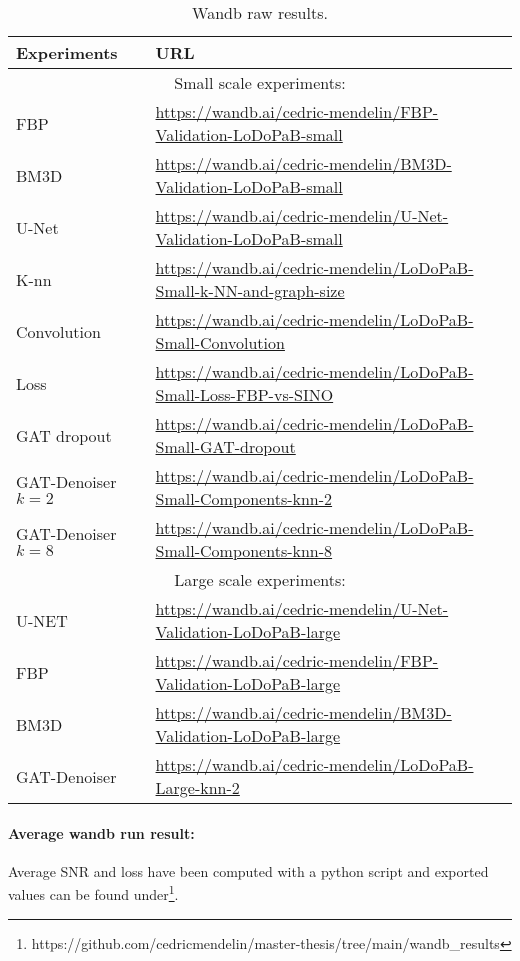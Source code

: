 \begin{table}[H]
  \centering
  \begin{tabular}{l|l}
    \toprule
    \textbf{Experiments} & \textbf{URL} \\ 
    \midrule
    \multicolumn{2}{c}{Small scale experiments:} \\
    FBP & \url{https://wandb.ai/cedric-mendelin/FBP-Validation-LoDoPaB-small} \\ \hline
    BM3D & \url{https://wandb.ai/cedric-mendelin/BM3D-Validation-LoDoPaB-small} \\ \hline
    U-Net& \url{https://wandb.ai/cedric-mendelin/U-Net-Validation-LoDoPaB-small} \\ \hline
    K-nn &\url{https://wandb.ai/cedric-mendelin/LoDoPaB-Small-k-NN-and-graph-size} \\ \hline
    Convolution & \url{https://wandb.ai/cedric-mendelin/LoDoPaB-Small-Convolution} \\ \hline
    Loss& \url{https://wandb.ai/cedric-mendelin/LoDoPaB-Small-Loss-FBP-vs-SINO} \\ \hline
    GAT dropout& \url{https://wandb.ai/cedric-mendelin/LoDoPaB-Small-GAT-dropout} \\ \hline
    GAT-Denoiser $k=2$ & \url{https://wandb.ai/cedric-mendelin/LoDoPaB-Small-Components-knn-2} \\ \hline
    GAT-Denoiser $k=8$ & \url{https://wandb.ai/cedric-mendelin/LoDoPaB-Small-Components-knn-8} \\ \hline
    \midrule
    \multicolumn{2}{c}{Large scale experiments:} \\
    U-NET & \url{https://wandb.ai/cedric-mendelin/U-Net-Validation-LoDoPaB-large} \\ \hline
    FBP& \url{https://wandb.ai/cedric-mendelin/FBP-Validation-LoDoPaB-large} \\ \hline
    BM3D& \url{https://wandb.ai/cedric-mendelin/BM3D-Validation-LoDoPaB-large} \\ \hline
    GAT-Denoiser & \url{https://wandb.ai/cedric-mendelin/LoDoPaB-Large-knn-2} \\ \hline

  \end{tabular}
  \caption{Wandb raw results.}
  \label{tab:wandb_results}
\end{table}

\paragraph{Average wandb run result:}
Average SNR and loss have been computed with a python script and exported values can be found under\footnote{https://github.com/cedricmendelin/master-thesis/tree/main/wandb\_results}.
